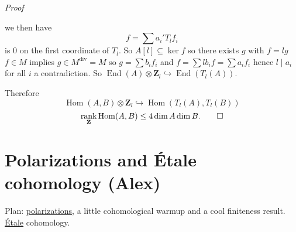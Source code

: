\documentclass[10pt,]{book}
\makeatletter
\renewcommand*{\proofname}{Proof}
\renewenvironment{proof}[1][\proofname]{\par
  \pushQED{\qed}%
  \normalfont \topsep6\p@\@plus6\p@\relax
  \trivlist
  \item\relax
    {\itshape
    #1\@addpunct{.}}\hspace\labelsep\ignorespaces
}{%
  \popQED\endtrivlist\@endpefalse
}
\numberwithin{equation}{section}
\newcommand{\lb}{[}
\newcommand{\rb}{]}
\newcommand{\ZZ}{\mathbf{Z}}
\DeclareMathOperator{\End}{End}
\DeclareMathOperator{\Hom}{Hom}
\DeclareMathOperator{\rank}{rank}
\makeatother
\begin{document}
\begin{proof}
we then have%
\begin{equation*}
f = \sum a_i' T_lf_i
\end{equation*}
is 0 on the first coordinate of \(T_l\). So \(A\lb l \rb \subseteq \ker f\) so there exists \(g\) with \(f= lg\) \(f\in M\) implies \(g\in M^\text{div} = M\) so \(g = \sum b_i f_i\) and \(f = \sum lb_i f = \sum a_i f_i\) hence \(l\mid a_i\) for all \(i\) a contradiction. So \(\End(A)\otimes \ZZ_l \hookrightarrow \End(T_l(A))\).%
\par
\hypertarget{p-242}{}%
Therefore%
\begin{equation*}
\Hom(A,B) \otimes \ZZ_l \hookrightarrow \Hom(T_l(A), T_l(B))
\end{equation*}
%
\begin{equation*}
\rank_\ZZ \Hom(A,B) \le 4 \dim A\dim B\text{.}\qedhere
\end{equation*}
%
\end{proof}
%
%
\typeout{************************************************}
\typeout{************************************************}
%
\section[{Polarizations and Étale cohomology (Alex)}]{Polarizations and Étale cohomology (Alex)}\label{sec-polarizations-etale}
\hypertarget{p-243}{}%
Plan: \hyperref[def-polarization]{polarizations}, a little cohomological warmup and a cool finiteness result. \hyperref[def-etale]{Étale} cohomology.%
%
%
\typeout{************************************************}
\typeout{************************************************}
%
\end{document}
